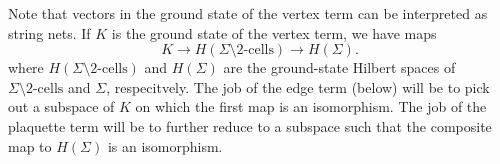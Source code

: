 \documentclass[12pt,a4paper]{article}
\newcommand{\tp}{\otimes}
\newcommand{\unit}{\mathds{1}}
\newcommand{\mch}{\mathcal{H}}
\newcommand\be            {\begin{equation}}
\newcommand\ee            {\end{equation}}
\newcommand{\ket}[1]{\ensuremath{\left|#1\right\rangle}}
\newcommand{\ethan}[1]{{\color{amethyst}\footnotesize{(EL) #1}}}
\newcommand{\kw}[1]{{\color{kwcolor}\footnotesize{(KW) #1}}}
\begin{document}
Note that vectors in the ground state of the vertex term can be interpreted as string nets.
If $K$ is the ground state of the vertex term, we have maps
\be
	K \to H(\Sigma \setminus \mbox{2-cells}) \to H(\Sigma) .
\ee
where $H(\Sigma \setminus \mbox{2-cells})$ and $H(\Sigma)$ are the ground-state Hilbert spaces of $\Sigma \setminus \mbox{2-cells}$ and $\Sigma$, respecitvely.
The job of the edge term (below) will be to pick out a subspace of $K$ on which the first map is an isomorphism. 
The job of the plaquette term will be to further reduce to a subspace such that the composite map to $H(\Sigma)$ is an isomorphism.

\end{document}
